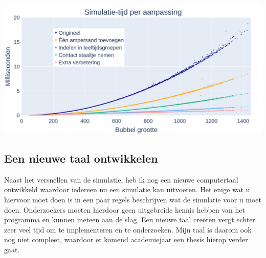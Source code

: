 \documentclass[10pt]{article} %
\begin{document}
\includegraphics[width=\linewidth]{simulatietijd.png}

\subsection*{Een nieuwe taal ontwikkelen}
Naast het versnellen van de simulatie, heb ik nog een nieuwe computertaal ontwikkeld waardoor iedereen nu een simulatie kan uitvoeren. Het enige wat u hiervoor moet doen is in een paar regels beschrijven wat de simulatie voor u moet doen. Onderzoekers moeten hierdoor geen uitgebreide kennis hebben van het programma en kunnen meteen aan de slag. Een nieuwe taal creëren vergt echter zeer veel tijd om te implementeren en te onderzoeken. Mijn taal is daarom ook nog niet compleet, waardoor er komend academiejaar een thesis hierop verder gaat.
\end{document}
